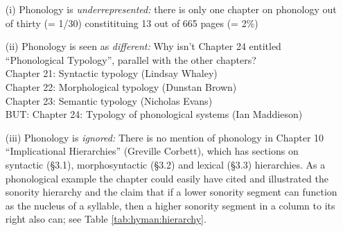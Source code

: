 \documentclass[output=paper]{langsci/langscibook}
\begin{document}
\begin{itemize}
 \item[(i)] Phonology is \textit{underrepresented:} there is only one chapter on phonology out of thirty (= 1/30) constitituing 13 out of 665 pages (= 2\%)
 \item[(ii)] Phonology is seen as\textit{ different: }Why isn’t Chapter 24 entitled “Phonological Typology”, parallel with the other chapters?
\\
    Chapter 21:  Syntactic typology (Lindsay Whaley)
\\
    Chapter 22:  Morphological typology (Dunstan Brown)
\\
    Chapter 23:  Semantic typology (Nicholas Evans)
\\
    BUT:  Chapter 24: Typology of phonological systems (Ian Maddieson)
\item[(iii)] Phonology is \textit{ignored:} There is no mention of phonology in Chapter 10 “Implicational Hierarchies” (Greville Corbett), which has sections on syntactic (§3.1), morphosyntactic (§3.2) and lexical (§3.3) hierarchies. As a phonological example the chapter could easily have cited and illustrated the sonority hierarchy \citep{Clements1990} and the claim that if a lower sonority segment can function as the nucleus of a syllable, then a higher sonority segment in a column to its right also can; see Table \ref{tab:hyman:hierarchy}.
\end{itemize}

\begin{table}
\caption{The sonority hierarchy: An implicational hierarchy in phonological typology}
\label{tab:hyman:hierarchy}
\end{table}
\end{document}
